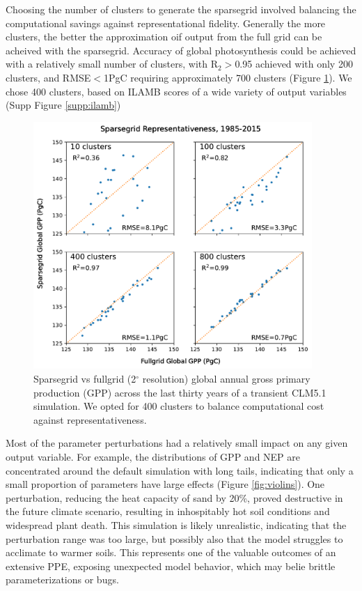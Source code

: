 \documentclass[draft]{agujournal2019}
\begin{document}
Choosing the number of clusters to generate the sparsegrid involved balancing the computational savings against representational fidelity. Generally the more clusters, the 
better the approximation oif output from the full grid can be acheived with the sparsegrid. Accuracy of global photosynthesis could be achieved with a relatively small number of clusters, with R$_2>$0.95 achieved with only 200 clusters, and RMSE$<$1PgC requiring approximately 700 clusters (Figure \ref{fig:sg}). We chose 400 clusters, based on ILAMB scores of a wide variety of output variables (Supp Figure \ref{supp:ilamb})
\begin{figure}[h]
\centering
\includegraphics[width=25pc]{../figs/sparsegrid_gpp.pdf}
\caption{Sparsegrid vs fullgrid (2$^{\circ}$ resolution) global annual gross primary production (GPP) across the last thirty years of a transient CLM5.1 simulation. We opted for 400 clusters to balance computational cost against representativeness.}
\label{fig:sg}
\end{figure}



Most of the parameter perturbations had a relatively small impact on any given output variable. For example, the distributions of GPP and NEP are concentrated around the default simulation with long tails, indicating that only a small proportion of parameters have large effects (Figure \ref{fig:violins}). One perturbation, reducing the heat capacity of sand by 20\%, proved destructive in the future climate scenario, resulting in inhospitably hot soil conditions and widespread plant death. This simulation is likely unrealistic, indicating that the perturbation range was too large, but possibly also that the model struggles to acclimate to warmer soils. This represents one of the valuable outcomes of an extensive PPE, exposing unexpected model behavior, which may belie brittle parameterizations or bugs.
\end{document}
